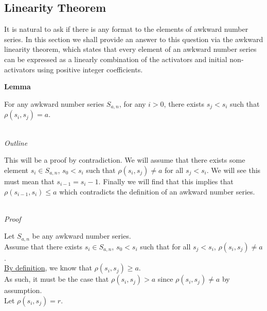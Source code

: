 \documentclass[a4paper,12pt]{article}
\begin{document}
\subsection{Linearity Theorem}

\noindent It is natural to ask if there is any format to the elements of awkward number series. In this section we shall provide an answer to this question via the awkward linearity theorem, which states that every element of an awkward number series can be expressed as a linearly combination of the activators and initial non-activators using positive integer coefficients.\\


\label{lemma:relation_to_other}
\hypertarget{lemma:relation_to_other}{}
\begin{tcolorbox}
\textbf{Lemma}

For any awkward number series $S_{a,n}$, for any $i > 0$, there exists $s_j < s_i$ such that $\rho(s_i, s_j) = a$.

\end{tcolorbox}

\noindent \\
\textit{Outline}

\noindent This will be a proof by contradiction. We will assume that there exists some element $s_i \in S_{a,n}$, $s_0 < s_i$ such that $\rho(s_i, s_j) \neq a$ for all $s_j < s_i$. We will see this must mean that $s_{i - 1} = s_i - 1$. Finally we will find that this implies that $\rho(s_{i - 1}, s_i) \leq a$ which contradicts the definition of an awkward number series.

\noindent \\
\textit{Proof}

\noindent Let $S_{a, n}$ be any awkward number series.\\

\noindent Assume that there exists $s_i \in S_{a, n}$, $s_0 < s_i$ such that for all $s_j < s_i$, $\rho(s_i, s_j) \neq a$.\\

\noindent \hyperlink{definition:awkward_number_series}{By definition}, we know that $\rho(s_i, s_j) \geq a$.\\

\noindent As such, it must be the case that $\rho(s_i, s_j) > a$ since $\rho(s_i, s_j) \neq a$ by assumption.\\

\noindent Let $\rho(s_i, s_j) = r$.\\
\end{document}
